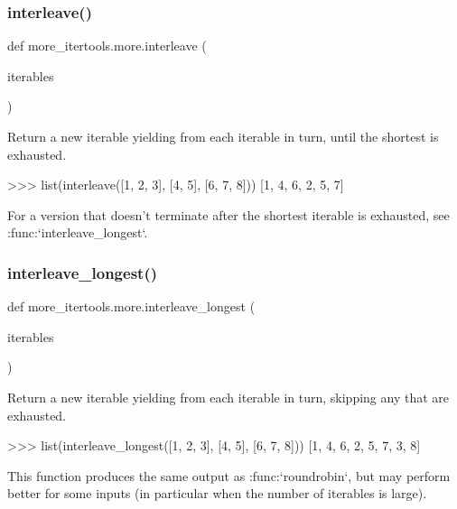 \subsubsection{\texorpdfstring{interleave()}{interleave()}}
{\footnotesize\ttfamily def more\+\_\+itertools.\+more.\+interleave (\begin{DoxyParamCaption}\item[{}]{iterables }\end{DoxyParamCaption})}

\begin{DoxyVerb}Return a new iterable yielding from each iterable in turn,
until the shortest is exhausted.

    >>> list(interleave([1, 2, 3], [4, 5], [6, 7, 8]))
    [1, 4, 6, 2, 5, 7]

For a version that doesn't terminate after the shortest iterable is
exhausted, see :func:`interleave_longest`.\end{DoxyVerb}
 \mbox{\label{namespacemore__itertools_1_1more_a57434352338eae6f24776d26c8040686}} 
\subsubsection{\texorpdfstring{interleave\+\_\+longest()}{interleave\_longest()}}
{\footnotesize\ttfamily def more\+\_\+itertools.\+more.\+interleave\+\_\+longest (\begin{DoxyParamCaption}\item[{}]{iterables }\end{DoxyParamCaption})}

\begin{DoxyVerb}Return a new iterable yielding from each iterable in turn,
skipping any that are exhausted.

    >>> list(interleave_longest([1, 2, 3], [4, 5], [6, 7, 8]))
    [1, 4, 6, 2, 5, 7, 3, 8]

This function produces the same output as :func:`roundrobin`, but may
perform better for some inputs (in particular when the number of iterables
is large).\end{DoxyVerb}
 \mbox{\label{namespacemore__itertools_1_1more_ab3e64108ca2dffa1a983a124fecdf8e2}} 
